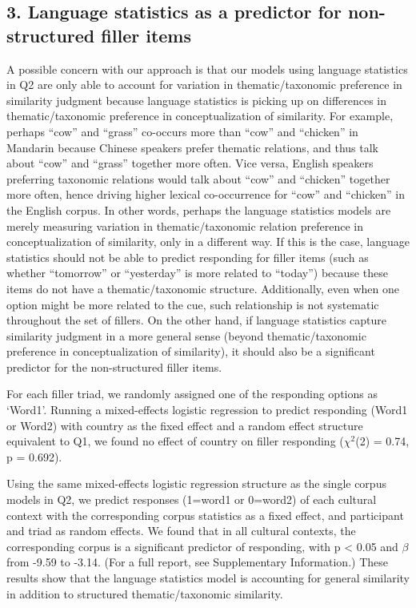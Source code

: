 \documentclass[10pt, letterpaper]{article}
\begin{document}
\hypertarget{language-statistics-as-a-predictor-for-non-structured-filler-items}{%
\subsection{3. Language statistics as a predictor for non-structured
filler
items}\label{language-statistics-as-a-predictor-for-non-structured-filler-items}}

A possible concern with our approach is that our models using language
statistics in Q2 are only able to account for variation in
thematic/taxonomic preference in similarity judgment because language
statistics is picking up on differences in thematic/taxonomic preference
in conceptualization of similarity. For example, perhaps ``cow'' and
``grass'' co-occurs more than ``cow'' and ``chicken'' in Mandarin
because Chinese speakers prefer thematic relations, and thus talk about
``cow'' and ``grass'' together more often. Vice versa, English speakers
preferring taxonomic relations would talk about ``cow'' and ``chicken''
together more often, hence driving higher lexical co-occurrence for
``cow'' and ``chicken'' in the English corpus. In other words, perhaps
the language statistics models are merely measuring variation in
thematic/taxonomic relation preference in conceptualization of
similarity, only in a different way. If this is the case, language
statistics should not be able to predict responding for filler items
(such as whether ``tomorrow'' or ``yesterday'' is more related to
``today'') because these items do not have a thematic/taxonomic
structure. Additionally, even when one option might be more related to
the cue, such relationship is not systematic throughout the set of
fillers. On the other hand, if language statistics capture similarity
judgment in a more general sense (beyond thematic/taxonomic preference
in conceptualization of similarity), it should also be a significant
predictor for the non-structured filler items.

For each filler triad, we randomly assigned one of the responding
options as `Word1'. Running a mixed-effects logistic regression to
predict responding (Word1 or Word2) with country as the fixed effect and
a random effect structure equivalent to Q1, we found no effect of
country on filler responding (\(\chi^2\)(2) = 0.74, p = 0.692).

Using the same mixed-effects logistic regression structure as the single
corpus models in Q2, we predict responses (1=word1 or 0=word2) of each
cultural context with the corresponding corpus statistics as a fixed
effect, and participant and triad as random effects. We found that in
all cultural contexts, the corresponding corpus is a significant
predictor of responding, with p \textless{} 0.05 and \(\beta\) from
-9.59 to -3.14. (For a full report, see Supplementary Information.)
These results show that the language statistics model is accounting for
general similarity in addition to structured thematic/taxonomic
similarity.
\end{document}
